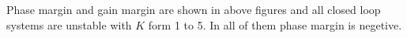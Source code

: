 \begin{itemize}
\begin{figure}[H]
    \end{figure}
\end{itemize}
Phase margin and gain margin are shown in above figures and all closed loop systems are unstable with $K$ form 1 to 5. In all of them phase margin is negetive.